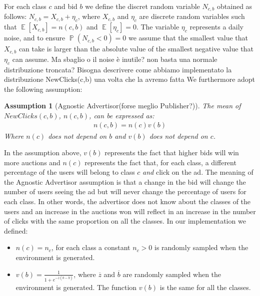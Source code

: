 \documentclass[11pt]{article} %
\DeclareMathOperator{\EX}{\mathbb{E}}
\DeclareMathOperator{\Prob}{\mathbb{P}}
\newtheorem*{assumption}{Assumption}
\begin{document}
For each class $c$ and bid $b$ we define the discret random variable $N_{c,b}$ obtained as follows: $N_{c,b} = X_{c,b} + \eta_c$, where $X_{c,b}$ and $\eta_c$ are discrete random variables such that $\EX[X_{c,b}]=n(c,b)$ and $\EX[\eta_c]=0$. The variable $\eta_c$ represents a daily noise, and to ensure $\Prob(N_{c,b} < 0) = 0$ we assume that the smallest value that $X_{c,b}$ can take is larger than the absolute value of the smallest negative value that $\eta_c$ can assume.{\color{red} Ma sbaglio o il noise è inutile? non basta una normale distribuzione troncata? Bisogna descrivere come abbiamo implementato la distribuzione NewClicks(c,b) una volta che la avremo fatta}
\newline
\newline
We furthermore adopt the following assumption: 
\begin{assumption}[Agnostic Advertisor{\color{red}(forse meglio Publisher?)}] The mean of $NewClicks(c,b)$, $n(c,b)$, can be expressed as:
\begin{align*}
n(c,b)=n(c)v(b)
\end{align*}
Where $n(c)$ does not depend on $b$ and $v(b)$ does not depend on $c$.
\end{assumption}
In the assumption above, $v(b)$ represents the fact that higher bids will win more auctions and $n(c)$ represents the fact that, for each class, a different percentage of the users will belong to class $c$ \textit{and} click on the ad. The meaning of the Agnostic Advertisor assumption is that a change in the bid will change the number of users seeing the ad but will never change the percentage of users for each class. In other words, the advertisor does not know about the classes of the users and an increase in the auctions won will reflect in an increase in the number of clicks with the same proportion on all the classes.
\newline
\newline
In our implementation we defined:
\begin{itemize}
\item $n(c)=n_c$, for each class a constant $n_c > 0$ is randomly sampled when the environment is generated.
\item $v(b)=\frac{1}{1+e^{-\overline z(b-\overline b)}}$, where $\overline z$ and $\overline b$ are randomly sampled when the environment is generated. The function $v(b)$ is the same for all the classes.
\end{itemize}
\end{document}

